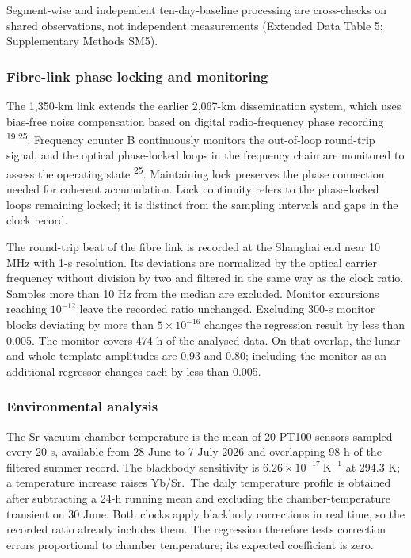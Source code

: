 \documentclass[
  11pt,
  a4paper,
]{article}
\begin{document}
Segment-wise and independent ten-day-baseline processing are
cross-checks on shared observations, not independent measurements
(Extended Data Table 5; Supplementary Methods SM5).

\hypertarget{fibre-link-phase-locking-and-monitoring}{%
\subsubsection{Fibre-link phase locking and
monitoring}\label{fibre-link-phase-locking-and-monitoring}}

The 1,350-km link extends the earlier 2,067-km dissemination system,
which uses bias-free noise compensation based on digital radio-frequency
phase recording \textsuperscript{19,25}. Frequency counter B
continuously monitors the out-of-loop round-trip signal, and the optical
phase-locked loops in the frequency chain are monitored to assess the
operating state \textsuperscript{25}. Maintaining lock preserves the
phase connection needed for coherent accumulation. Lock continuity
refers to the phase-locked loops remaining locked; it is distinct from
the sampling intervals and gaps in the clock record.

The round-trip beat of the fibre link is recorded at the Shanghai end
near 10 MHz with 1-s resolution. Its deviations are normalized by the
optical carrier frequency without division by two and filtered in the
same way as the clock ratio. Samples more than 10 Hz from the median are
excluded. Monitor excursions reaching \(10^{-12}\) leave the recorded
ratio unchanged. Excluding 300-s monitor blocks deviating by more than
\(5\times10^{-16}\) changes the regression result by less than 0.005.
The monitor covers 474 h of the analysed data. On that overlap, the
lunar and whole-template amplitudes are 0.93 and 0.80; including the
monitor as an additional regressor changes each by less than 0.005.

\hypertarget{environmental-analysis}{%
\subsubsection{Environmental analysis}\label{environmental-analysis}}

The Sr vacuum-chamber temperature is the mean of 20 PT100 sensors
sampled every 20 s, available from 28 June to 7 July 2026 and
overlapping 98 h of the filtered summer record. The blackbody
sensitivity is \(6.26\times10^{-17}\ \mathrm{K^{-1}}\) at 294.3 K; a
temperature increase raises Yb/Sr.~The daily temperature profile is
obtained after subtracting a 24-h running mean and excluding the
chamber-temperature transient on 30 June. Both clocks apply blackbody
corrections in real time, so the recorded ratio already includes them.
The regression therefore tests correction errors proportional to chamber
temperature; its expected coefficient is zero.
\end{document}

